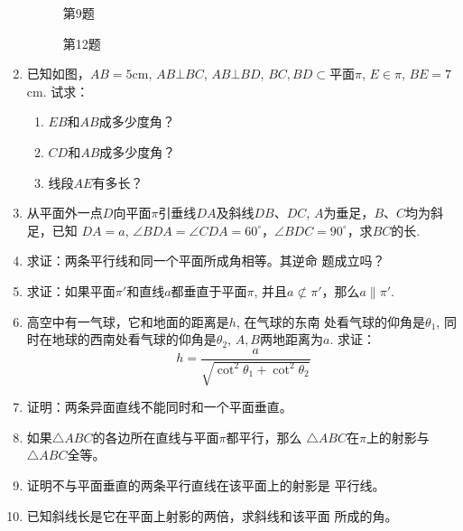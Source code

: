 \begin{enumerate}
\begin{figure}[htp]
\begin{minipage}[t]{0.48\textwidth}
\begin{tikzpicture}[>=latex, scale=1]
  \end{tikzpicture}
  \caption*{第9题}
  \end{minipage}
  \begin{minipage}[t]{0.48\textwidth}
  \centering
  \caption*{第12题}
  \end{minipage}
\end{figure}

\item 已知如图，$AB=5$cm, 
$AB\bot BC$, $AB\bot BD$, $BC,BD\subset $平面$\pi$, $E\in\pi$, $BE=7$cm. 试求：
\begin{enumerate}
  \item $EB$和$AB$成多少度角？
  \item $CD$和$AB$成多少度角？
  \item 线段$AE$有多长？
\end{enumerate}
\item 从平面外一点$D$向平面$\pi$引垂线$DA$及斜线$DB$、$DC$, 
$A$为垂足，$B$、$C$均为斜足，已知 $DA=a$, $\angle BDA=\angle CDA=60^{\circ}$，$\angle BDC=90^{\circ}$，求$BC$的长.
\item 求证：两条平行线和同一个平面所成角相等。其逆命
题成立吗？
\item 求证：如果平面$\pi'$和直线$a$都垂直于平面$\pi$, 并且$a\not\subset\pi'$，那么$a\parallel \pi'$.

\item 高空中有一气球，它和地面的距离是$h$, 在气球的东南
处看气球的仰角是$\theta_1$, 同时在地球的西南处看气球的仰角是$\theta_2$, $A,B$两地距离为$a$. 求证：
\[h=\frac{a}{\sqrt{\cot^2\theta_1+\cot^2\theta_2}}\]
\item 证明：两条异面直线不能同时和一个平面垂直。
\item 如果$\triangle ABC$的各边所在直线与平面$\pi$都平行，那么
$\triangle ABC$在$\pi$上的射影与$\triangle ABC$全等。
\item 证明不与平面垂直的两条平行直线在该平面上的射影是
平行线。
\item 已知斜线长是它在平面上射影的两倍，求斜线和该平面
所成的角。


\end{enumerate}
